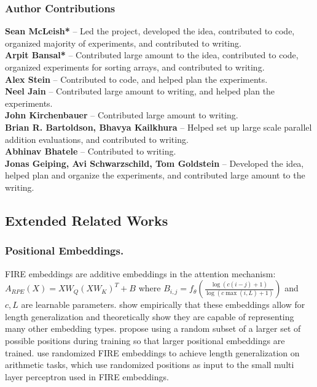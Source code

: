 \documentclass{article}
\begin{document}
\subsubsection*{Author Contributions}
\textbf{Sean McLeish*} -- Led the project, developed the idea, contributed to code, organized majority of experiments, and contributed to writing. \\
\textbf{Arpit Bansal*} -- Contributed large amount to the idea, contributed to code, organized experiments for sorting arrays, and contributed to writing. \\
\textbf{Alex Stein} -- Contributed to code, and helped plan the experiments. \\
\textbf{Neel Jain} -- Contributed large amount to writing, and helped plan the experiments. \\
\textbf{John Kirchenbauer} --  Contributed large amount to writing. \\
\textbf{Brian R. Bartoldson, Bhavya Kailkhura} -- Helped set up large scale parallel addition evaluations, and contributed to writing. \\
\textbf{Abhinav Bhatele} -- Contributed to writing.\\
\textbf{Jonas Geiping, Avi Schwarzschild, Tom Goldstein} -- Developed the idea, helped plan and organize the experiments, and contributed large amount to the writing.

\subsection{Extended Related Works}
\subsubsection{Positional Embeddings.}
\label{app:rel-works-pos-emb}
FIRE embeddings are additive embeddings in the attention mechanism:
\(A_{RPE}(X)=XW_Q(XW_K)^T+B\) where \(B_{i,j}=f_\theta \left (\frac{\log(c(i-j)+1)}{\log(c\max(i,L)+1)}\right )\) and \(c,L\) are learnable parameters.
\citet{li2023functional} show empirically that these embeddings allow for length generalization and theoretically show they are capable of representing many other embedding types.
\citet{ruoss2023randomized} propose using a random subset of a larger set of possible positions during training so that larger positional embeddings are trained. 
\citet{zhou2024transformers} use randomized FIRE \citep{ruoss2023randomized, li2023functional} embeddings to achieve length generalization on arithmetic tasks, which use randomized positions as input to the small multi layer perceptron used in FIRE embeddings. 
\end{document}
